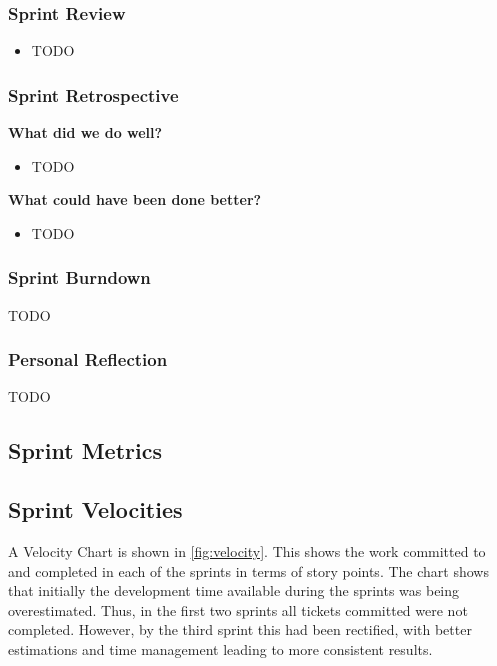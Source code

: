   \subsubsection{Sprint Review}
  
  \begin{itemize}
    \item TODO
  \end{itemize}
  
  \subsubsection{Sprint Retrospective}
  \textbf{What did we do well?}
  \begin{itemize}
    \item TODO
  \end{itemize}
  
  \noindent\textbf{What could have been done better?}
  \begin{itemize}
    \item TODO
  \end{itemize}
  
  \subsubsection{Sprint Burndown}
  
  TODO
  
  \subsubsection{Personal Reflection}
  TODO
  

	\subsection{Sprint Metrics}
  
  \subsection{Sprint Velocities}
  A Velocity Chart is shown in \autoref{fig:velocity}.  This shows the work committed to and completed in each of the sprints in terms of story points. The chart shows that initially the development time available during the sprints was being overestimated. Thus, in the first two sprints all tickets committed were not completed. However, by the third sprint this had been rectified, with better estimations and time management leading to  more consistent results. 
  
